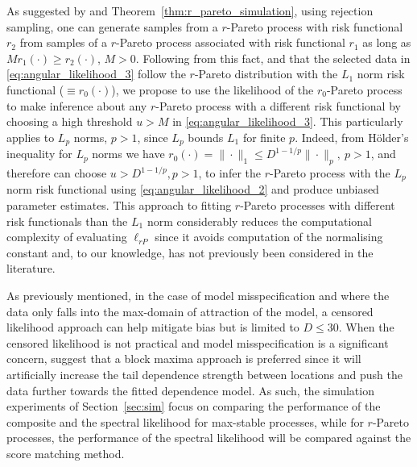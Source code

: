 \documentclass[12pt]{article}
\begin{document}
As suggested by \citet[Proposition 2]{Dombry.etal:2024} and Theorem~\ref{thm:r_pareto_simulation}, using rejection sampling, one can generate samples from a $r$-Pareto process with risk functional $r_2$ from samples of a $r$-Pareto process associated with  risk functional $r_1$ as long as 
$Mr_1(\cdot)\geq r_2(\cdot)$,
$M>0$. 
Following from this fact, and that the selected data in \eqref{eq:angular_likelihood_3} follow the $r$-Pareto distribution with the $L_1$ norm risk functional ($\equiv r_0(\cdot)$), we propose to use the likelihood of the $r_0$-Pareto process to make inference about any $r$-Pareto process with a different risk functional by choosing a high threshold $u>M$ in \eqref{eq:angular_likelihood_3}.
This particularly applies to $L_p$ norms, $p> 1$, since $L_{p}$ bounds $L_1$ for finite $p$.
Indeed, from H\"older's inequality for $L_p$ norms we have $r_0(\cdot)=\|\cdot\|_1 \leq D^{1-1/p}\|\cdot\|_p,\ p>1$, and therefore can choose $u>D^{1-1/p}, p>1$, to infer the $r$-Pareto process with the $L_p$ norm risk functional using \eqref{eq:angular_likelihood_2} and produce unbiased parameter estimates. 
This approach to fitting $r$-Pareto processes with different risk functionals than the $L_1$ norm considerably reduces the computational complexity of evaluating $\ell_{rP}$
since it 
avoids
computation of the normalising constant and, to our knowledge, has not previously been considered in the literature. 

As previously mentioned, in the case of model misspecification and where the data only falls into the max-domain of attraction of the model, a censored likelihood approach can help mitigate bias \citep{Wadsworth.Tawn:2014, Huser.etal:2016} but is limited to $D\leq 30$. When the censored likelihood is not practical and model misspecification is a significant concern, \citet{Huser.etal:2016} suggest that a block maxima approach is preferred since it will artificially increase the tail dependence strength between locations and push the data further towards the fitted dependence model. 
% 
As such, the simulation experiments of Section~\ref{sec:sim} focus on comparing the performance of the composite and the spectral likelihood for max-stable processes, while for $r$-Pareto processes, the performance of the spectral likelihood will be compared against the score matching method.
\end{document}
